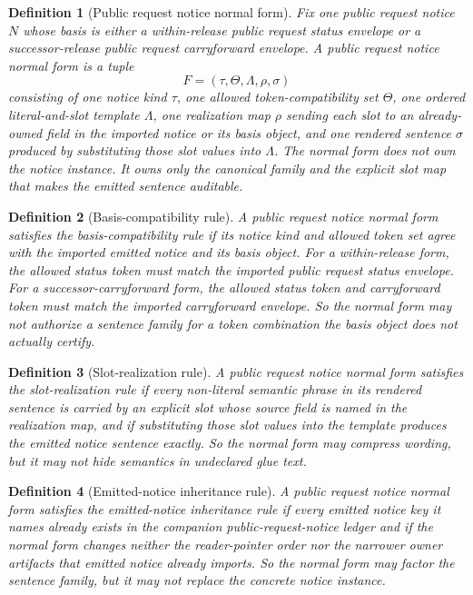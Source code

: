 \documentclass[11pt]{article}
\newtheorem{definition}{Definition}
\begin{document}
\begin{definition}[Public request notice normal form]
Fix one public request notice $N$ whose basis is either a within-release public request status envelope or a successor-release public request carryforward envelope.
A \emph{public request notice normal form} is a tuple
\[
F=(\tau,\Theta,\Lambda,\rho,\sigma)
\]
consisting of one notice kind $\tau$, one allowed token-compatibility set $\Theta$, one ordered literal-and-slot template $\Lambda$, one realization map $\rho$ sending each slot to an already-owned field in the imported notice or its basis object, and one rendered sentence $\sigma$ produced by substituting those slot values into $\Lambda$.
The normal form does not own the notice instance.
It owns only the canonical family and the explicit slot map that makes the emitted sentence auditable.
\end{definition}

\begin{definition}[Basis-compatibility rule]
A public request notice normal form satisfies the \emph{basis-compatibility rule} if its notice kind and allowed token set agree with the imported emitted notice and its basis object.
For a within-release form, the allowed status token must match the imported public request status envelope.
For a successor-carryforward form, the allowed status token and carryforward token must match the imported carryforward envelope.
So the normal form may not authorize a sentence family for a token combination the basis object does not actually certify.
\end{definition}

\begin{definition}[Slot-realization rule]
A public request notice normal form satisfies the \emph{slot-realization rule} if every non-literal semantic phrase in its rendered sentence is carried by an explicit slot whose source field is named in the realization map, and if substituting those slot values into the template produces the emitted notice sentence exactly.
So the normal form may compress wording, but it may not hide semantics in undeclared glue text.
\end{definition}

\begin{definition}[Emitted-notice inheritance rule]
A public request notice normal form satisfies the \emph{emitted-notice inheritance rule} if every emitted notice key it names already exists in the companion public-request-notice ledger and if the normal form changes neither the reader-pointer order nor the narrower owner artifacts that emitted notice already imports.
So the normal form may factor the sentence family, but it may not replace the concrete notice instance.
\end{definition}
\end{document}
